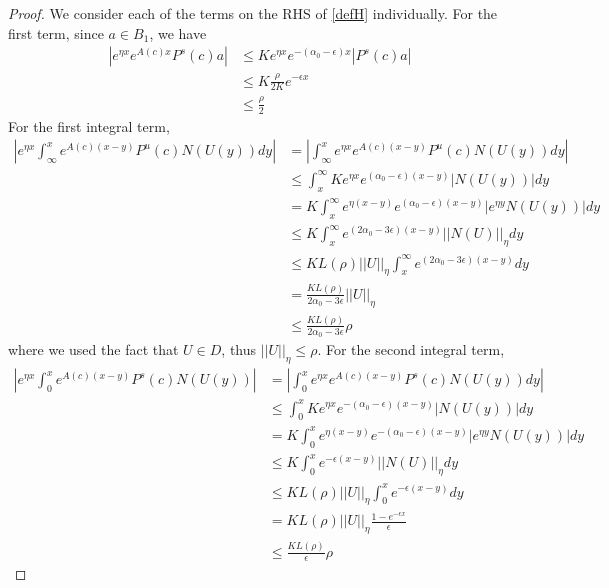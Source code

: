 \documentclass[thesis.tex]{subfiles}
\begin{document}
\begin{lemma}
\begin{proof}
We consider each of the terms on the RHS of \eqref{defH} individually. For the first term, since $a \in B_1$, we have
\begin{align*}
|e^{\eta x} e^{A(c)x } P^s(c) a | &\leq K e^{\eta x} e^{-(\alpha_0 - \epsilon) x} | P^s(c) a |\\
&\leq K \frac{\rho}{2 K} e^{-\epsilon x}\\
&\leq \frac{\rho}{2}
\end{align*}
For the first integral term,
\begin{align*}
\left| e^{\eta x} \int_\infty^x e^{A(c)(x - y)}P^u(c) N(U(y))dy \right| &= \left| \int_\infty^x e^{\eta x} e^{A(c)(x - y)}P^u(c) N(U(y))dy \right|\\
&\leq \int_x^\infty K e^{\eta x}e^{(\alpha_0 - \epsilon)(x - y)}|N(U(y))|dy \\
&= K \int_x^\infty e^{\eta (x - y)}e^{(\alpha_0 - \epsilon)(x - y)} | e^{\eta y} N(U(y))|dy \\
&\leq K \int_x^\infty e^{(2 \alpha_0 - 3 \epsilon)(x - y)} || N(U)||_\eta dy \\
&\leq K L(\rho) ||U||_\eta \int_x^\infty e^{(2 \alpha_0 - 3 \epsilon)(x - y)} dy \\
&= \frac{ K L(\rho) }{2 \alpha_0 - 3 \epsilon} ||U||_\eta \\
&\leq \frac{ K L(\rho) }{2 \alpha_0 - 3 \epsilon} \rho
\end{align*}
where we used the fact that $U \in D$, thus $||U||_\eta \leq \rho$. For the second integral term,
\begin{align*}
\left| e^{\eta x} \int_0^x e^{A(c)(x - y)}P^s(c) N(U(y)) \right| &= \left| \int_0^x e^{\eta x} e^{A(c)(x - y)}P^s(c) N(U(y)) dy \right|\\
&\leq \int_0^x K e^{\eta x}e^{-(\alpha_0 - \epsilon)(x -y)}|N(U(y))|dy \\
&= K \int_0^x e^{\eta (x - y)}e^{-(\alpha_0 - \epsilon)(x - y)}| e^{\eta y} N(U(y))|dy \\
&\leq K \int_0^x e^{-\epsilon(x - y)} || N(U)||_\eta dy \\
&\leq K L(\rho) ||U||_\eta \int_0^x e^{-\epsilon(x - y)} dy \\
&= K L(\rho) ||U||_\eta \frac{1 - e^{-\epsilon x} }{\epsilon} \\
&\leq \frac{K L(\rho)}{\epsilon} \rho
\end{align*}


\end{proof}
\end{lemma}
\end{document}

